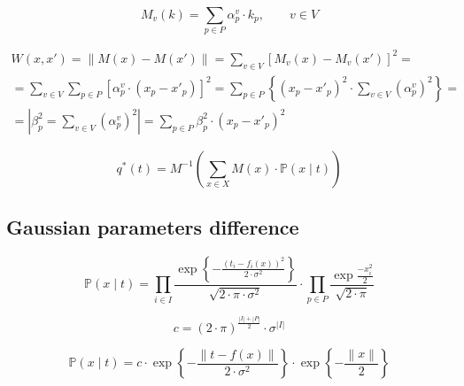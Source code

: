 \begin{equation*}
  M_v\left( k \right) = \sum_{p \in P} \alpha_p^v \cdot k_p, \qquad v \in V
\end{equation*}

\begin{equation*}
    \begin{split}
      W \left( x, x' \right)
      = \left\| M\left( x \right) - M\left( x' \right) \right\|
      = \sum_{v \in V} \left[
          M_v\left( x \right) - M_v\left( x' \right)
        \right]^2 = \\
      = \sum_{v \in V} \sum_{p \in P} \left[
          \alpha_p^v \cdot \left( x_p - x'_p \right)
        \right]^2
      = \sum_{p \in P} \left\{ \left( x_p - x'_p \right)^2
        \cdot \sum_{v \in V} \left( \alpha_p^v \right)^2 \right\} = \\
      = \left| \beta_p^2 = \sum_{v \in V} \left( \alpha_p^v \right)^2 \right|
      = \sum_{p \in P}
          \beta_p^2 \cdot \left( x_p - x'_p \right)^2
    \end{split}
\end{equation*}

\begin{equation*}
  q^* \left( t \right)
  = M^{-1} \left(
      \sum_{x \in X} M\left( x \right) \cdot \mathbb{P}\left( x \mid t \right)
    \right)
\end{equation*}

\subsection{Gaussian parameters difference}

\begin{equation*}
  \mathbb{P}\left( x \mid t \right)
  = \prod_{i \in I}
    \frac{\exp{\left\{- \frac{\left( t_i - f_i\left( x \right) \right)^2}
         {2 \cdot \sigma^2} \right\}}}{\sqrt{2 \cdot \pi \cdot \sigma^2}}
    \cdot
    \prod_{p \in P}
    \frac{\exp{\frac{-x_i^2}{2}}}{\sqrt{2 \cdot \pi}}
\end{equation*}

\begin{equation*}
  c = \left( 2 \cdot \pi \right)^{\frac{\left| I \right| + \left| P \right|}{2}}
      \cdot \sigma^{\left| I \right|}
\end{equation*}

\begin{equation*}
    \mathbb{P}\left( x \mid t \right)
    = c
      \cdot \exp{\left\{ - \frac{\left\| t - f\left( x \right) \right\|}
                                {2 \cdot \sigma^2} \right\}}
      \cdot \exp{\left\{ - \frac{\left\| x \right\|}{2} \right\}}
\end{equation*}

